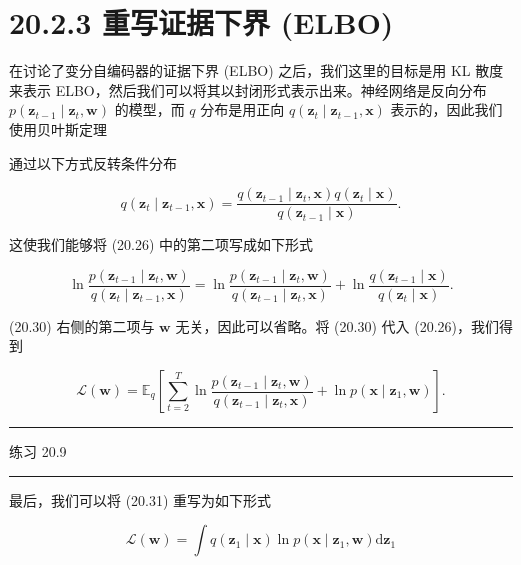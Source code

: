 \documentclass[10pt]{article}
\newcommand{\HRule}{\begin{center}\rule{0.9\linewidth}{0.2mm}\end{center}}
\begin{document}
\section*{20.2.3 重写证据下界 (ELBO)}

在讨论了变分自编码器的证据下界 (ELBO) 之后，我们这里的目标是用 KL 散度来表示 ELBO，然后我们可以将其以封闭形式表示出来。神经网络是反向分布 \(p\left( {{\mathbf{z}}_{t - 1} \mid  {\mathbf{z}}_{t},\mathbf{w}}\right)\) 的模型，而 \(q\) 分布是用正向 \(q\left( {{\mathbf{z}}_{t} \mid  {\mathbf{z}}_{t - 1},\mathbf{x}}\right)\) 表示的，因此我们使用贝叶斯定理

通过以下方式反转条件分布

\[
q\left( {{\mathbf{z}}_{t} \mid  {\mathbf{z}}_{t - 1},\mathbf{x}}\right)  = \frac{q\left( {{\mathbf{z}}_{t - 1} \mid  {\mathbf{z}}_{t},\mathbf{x}}\right) q\left( {{\mathbf{z}}_{t} \mid  \mathbf{x}}\right) }{q\left( {{\mathbf{z}}_{t - 1} \mid  \mathbf{x}}\right) }. \tag{20.29}
\]

这使我们能够将 (20.26) 中的第二项写成如下形式

\[
\ln \frac{p\left( {{\mathbf{z}}_{t - 1} \mid  {\mathbf{z}}_{t},\mathbf{w}}\right) }{q\left( {{\mathbf{z}}_{t} \mid  {\mathbf{z}}_{t - 1},\mathbf{x}}\right) } = \ln \frac{p\left( {{\mathbf{z}}_{t - 1} \mid  {\mathbf{z}}_{t},\mathbf{w}}\right) }{q\left( {{\mathbf{z}}_{t - 1} \mid  {\mathbf{z}}_{t},\mathbf{x}}\right) } + \ln \frac{q\left( {{\mathbf{z}}_{t - 1} \mid  \mathbf{x}}\right) }{q\left( {{\mathbf{z}}_{t} \mid  \mathbf{x}}\right) }. \tag{20.30}
\]

(20.30) 右侧的第二项与 \(\mathbf{w}\) 无关，因此可以省略。将 (20.30) 代入 (20.26)，我们得到

\[
\mathcal{L}\left( \mathbf{w}\right)  = {\mathbb{E}}_{q}\left\lbrack  {\mathop{\sum }\limits_{{t = 2}}^{T}\ln \frac{p\left( {{\mathbf{z}}_{t - 1} \mid  {\mathbf{z}}_{t},\mathbf{w}}\right) }{q\left( {{\mathbf{z}}_{t - 1} \mid  {\mathbf{z}}_{t},\mathbf{x}}\right) } + \ln p\left( {\mathbf{x} \mid  {\mathbf{z}}_{1},\mathbf{w}}\right) }\right\rbrack  . \tag{20.31}
\]

\HRule

练习 20.9

\HRule

最后，我们可以将 (20.31) 重写为如下形式

\[
\mathcal{L}\left( \mathbf{w}\right)  = \int q\left( {{\mathbf{z}}_{1} \mid  \mathbf{x}}\right) \ln p\left( {\mathbf{x} \mid  {\mathbf{z}}_{1},\mathbf{w}}\right) \mathrm{d}{\mathbf{z}}_{1}
\]
\end{document}
